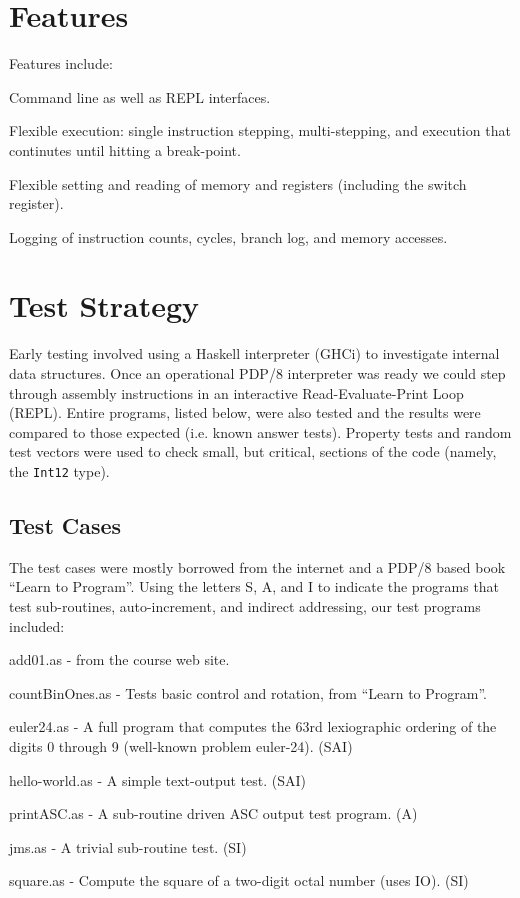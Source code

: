 \documentclass[11pt]{exam}
\def\Int{\texttt{Int12}}
\begin{document}
\section{Features}
Features include:
{\small
\begin{itemize*}
\item Command line as well as REPL interfaces.
\item Flexible execution: single instruction stepping, multi-stepping, and execution that continutes until hitting a break-point.
\item Flexible setting and reading of memory and registers (including the switch register).
\item Logging of instruction counts, cycles, branch log, and memory accesses.
\end{itemize*}
}
\section{Test Strategy}
Early testing involved using a Haskell interpreter (GHCi) to
investigate internal data structures.  Once an operational PDP/8
interpreter was ready we could step through assembly instructions in
an interactive Read-Evaluate-Print Loop (REPL).  Entire programs,
listed below, were also tested and the results were compared to those
expected (i.e. known answer tests).  Property tests and random test
vectors were used to check small, but critical, sections of the code
(namely, the \Int{} type).

\subsection{Test Cases}
The test cases were mostly borrowed from the internet and a PDP/8
based book ``Learn to Program''.  Using the letters S, A, and I to
indicate the programs that test sub-routines, auto-increment, and
indirect addressing, our test programs included:

{\small
\begin{itemize*}
\item add01.as - from the course web site.
\item countBinOnes.as - Tests basic control and rotation, from ``Learn to Program''.
\item euler24.as - A full program that computes the 63rd lexiographic ordering of
  the digits 0 through 9 (well-known problem euler-24). (SAI)
\item hello-world.as - A simple text-output test. (SAI)
\item printASC.as - A sub-routine driven ASC output test program.  (A)
\item jms.as - A trivial sub-routine test. (SI)
\item square.as - Compute the square of a two-digit octal number (uses IO).  (SI)
\end{itemize*}
}
\end{document}
